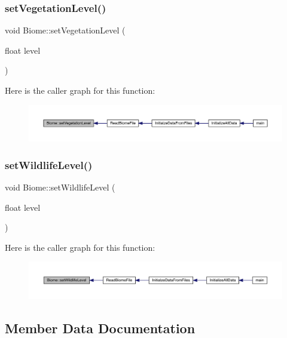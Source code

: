 \subsubsection{\texorpdfstring{set\+Vegetation\+Level()}{setVegetationLevel()}}
{\footnotesize\ttfamily void Biome\+::set\+Vegetation\+Level (\begin{DoxyParamCaption}\item[{float}]{level }\end{DoxyParamCaption})}

Here is the caller graph for this function\+:
\nopagebreak
\begin{figure}[H]
\begin{center}
\leavevmode
\includegraphics[width=350pt]{d6/dd0/class_biome_adbe071450d7411ddd3f886b1c84c2029_icgraph}
\end{center}
\end{figure}
\mbox{\label{class_biome_afe05b01787008c396ccad3ffd7e6d6cd}} 
\subsubsection{\texorpdfstring{set\+Wildlife\+Level()}{setWildlifeLevel()}}
{\footnotesize\ttfamily void Biome\+::set\+Wildlife\+Level (\begin{DoxyParamCaption}\item[{float}]{level }\end{DoxyParamCaption})}

Here is the caller graph for this function\+:
\nopagebreak
\begin{figure}[H]
\begin{center}
\leavevmode
\includegraphics[width=350pt]{d6/dd0/class_biome_afe05b01787008c396ccad3ffd7e6d6cd_icgraph}
\end{center}
\end{figure}


\subsection{Member Data Documentation}
\mbox{\label{class_biome_a80ffc723aed56c5d9390a45e22a7742c}} 
